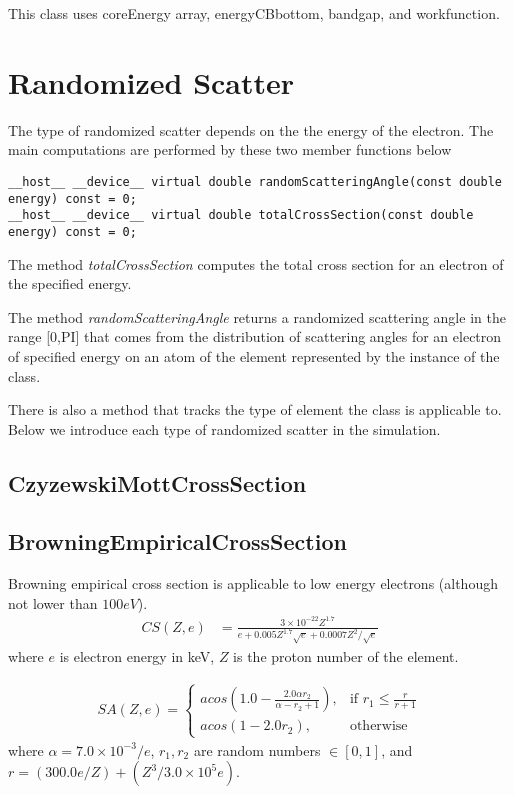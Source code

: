 This class uses coreEnergy array, energyCBbottom, bandgap, and workfunction.

\section{Randomized Scatter}
The type of randomized scatter depends on the the energy of the electron. The main computations are performed by these two member functions below

\begin{lstlisting}
__host__ __device__ virtual double randomScatteringAngle(const double energy) const = 0;
__host__ __device__ virtual double totalCrossSection(const double energy) const = 0;
\end{lstlisting}

The method \textit{totalCrossSection} computes the total cross section for an electron of the specified energy.

The method \textit{randomScatteringAngle} returns a randomized scattering angle in the range [0,PI] that comes from the distribution of scattering angles for an electron of specified energy on an atom of the element represented by the instance of the class.

There is also a method that tracks the type of element the class is applicable to. Below we introduce each type of randomized scatter in the simulation.

\subsection{CzyzewskiMottCrossSection}
\subsection{BrowningEmpiricalCrossSection}
Browning empirical cross section is applicable to low energy electrons (although not lower than $100eV$). 
\begin{align*}
   CS(Z, e) &= \frac{3\times 10^{-22} Z^{1.7}}{e + 0.005 Z^{1.7} \sqrt{e} + 0.0007 Z^{2} / \sqrt{e}}
\end{align*}
where $e$ is electron energy in keV, $Z$ is the proton number of the element.

\begin{align*}
    SA(Z, e)= 
\begin{cases}
    acos\left (1.0 - \frac{2.0 \alpha r_2}{\alpha - r_2 + 1}\right ),& \text{if } r_1 \leq \frac{r}{r+1}\\
    acos(1-2.0r_2),& \text{otherwise}
\end{cases}
\end{align*}
where $\alpha = 7.0\times 10^{-3}/e$, $r_1, r_2$ are random numbers $\in [0, 1]$, and $r = (300.0 e / Z) + (Z^3 / 3.0\times 10^5 e)$.

